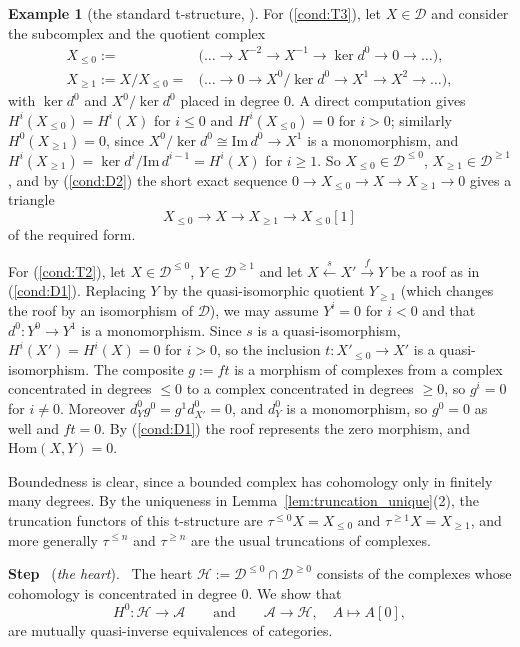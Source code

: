 \documentclass[12pt]{amsart}
\newcommand{\condref}[1]{\textup{(\ref{#1})}}
\numberwithin{theorem}{section}
\theoremstyle{definition}
\newtheorem{example}[theorem]{Example}
\newcounter{pstep}
\newcommand{\step}[1]{\par\medskip\noindent\refstepcounter{pstep}\textbf{Step \thepstep}\ (\textit{#1}).\ \ignorespaces}
\newcommand{\calA}{\mathcal{A}}
\newcommand{\Hom}{\mathrm{Hom}}
\newcommand{\image}{\mathrm{Im} \,}
\newcommand{\calD}{\mathcal{D}}
\newcommand{\calH}{\mathcal{H}}
\newcommand{\Dle}[1]{\calD^{\leqslant #1}}
\newcommand{\Dge}[1]{\calD^{\geqslant #1}}
\begin{document}
\begin{example}[the standard t-structure, {\cite[Exemple~1.3.2]{BBD82}}]
		For \condref{cond:T3}, let $X \in \calD$ and consider the subcomplex and the quotient complex
		\begin{align*}
			X_{\leqslant 0} := &\big( \ldots \to X^{-2} \to X^{-1} \to \ker d^0 \to 0 \to \ldots \big), \\
			X_{\geqslant 1} := X / X_{\leqslant 0} = &\big( \ldots \to 0 \to X^0 / \ker d^0 \to X^1 \to X^2 \to 
			\ldots \big),
		\end{align*}
		with $\ker d^0$ and $X^0 / \ker d^0$ placed in degree $0$.
		A direct computation gives $H^i(X_{\leqslant 0}) = H^i(X)$ for $i \leqslant 0$ and $H^i(X_{\leqslant 0}) = 0$ for $i > 0$;
		similarly $H^0(X_{\geqslant 1}) = 0$, since $X^0 / \ker d^0 \cong \image d^0 \to X^1$ is a monomorphism, and $H^i(X_{\geqslant 1}) = \ker d^i / \image d^{i-1} = H^i(X)$ for $i \geqslant 1$.
		So $X_{\leqslant 0} \in \Dle{0}$, $X_{\geqslant 1} \in \Dge{1}$, and by \condref{cond:D2} the short exact sequence $0 \to X_{\leqslant 0} \to X \to X_{\geqslant 1} \to 0$ gives a triangle
		\[
		X_{\leqslant 0} \longrightarrow X \longrightarrow X_{\geqslant 1} \longrightarrow X_{\leqslant 0}[1]
		\]
		of the required form.
		
		For \condref{cond:T2}, let $X \in \Dle{0}$, $Y \in \Dge{1}$ and let $X \xleftarrow{s} X' \xrightarrow{f} Y$ be a roof as in \condref{cond:D1}.
		Replacing $Y$ by the quasi-isomorphic quotient $Y_{\geqslant 1}$ (which changes the roof by an isomorphism of $\calD$), we may assume $Y^i = 0$ for $i < 0$ and that $d^0 \colon Y^0 \to Y^1$ is a monomorphism.
		Since $s$ is a quasi-isomorphism, $H^i(X') = H^i(X) = 0$ for $i > 0$, so the inclusion $t \colon X'_{\leqslant 0} \to X'$ is a quasi-isomorphism.
		The composite $g := f t$ is a morphism of complexes from a complex concentrated in degrees $\leqslant 0$ to a complex concentrated in degrees $\geqslant 0$, so $g^i = 0$ for $i \neq 0$.
		Moreover $d^0_Y g^0 = g^1 d^0_{X'} = 0$, and $d^0_Y$ is a monomorphism, so $g^0 = 0$ as well and $f t = 0$.
		By \condref{cond:D1} the roof represents the zero morphism, and $\Hom(X, Y) = 0$.
		
		Boundedness is clear, since a bounded complex has cohomology only in finitely many degrees.
		By the uniqueness in Lemma~\ref{lem:truncation_unique}(2), the truncation functors of this t-structure are $\tau^{\leqslant 0} X = X_{\leqslant 0}$ and $\tau^{\geqslant 1} X = X_{\geqslant 1}$, and more generally $\tau^{\leqslant n}$ and $\tau^{\geqslant n}$ are the usual truncations of complexes.
		
		\step{the heart}
		The heart $\calH := \Dle{0} \cap \Dge{0}$ consists of the complexes whose cohomology is concentrated in degree $0$.
		We show that
		\[
		H^0 \colon \calH \longrightarrow \calA
		\qquad\text{and}\qquad
		\calA \longrightarrow \calH, \quad A \longmapsto A[0],
		\]
		are mutually quasi-inverse equivalences of categories.
		

\end{example}
\end{document}
